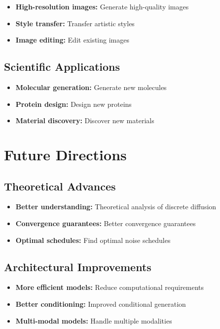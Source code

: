 \begin{itemize}
    \item \textbf{High-resolution images:} Generate high-quality images
    \item \textbf{Style transfer:} Transfer artistic styles
    \item \textbf{Image editing:} Edit existing images
\end{itemize}

\subsection{Scientific Applications}

\begin{itemize}
    \item \textbf{Molecular generation:} Generate new molecules
    \item \textbf{Protein design:} Design new proteins
    \item \textbf{Material discovery:} Discover new materials
\end{itemize}

\section{Future Directions}

\subsection{Theoretical Advances}

\begin{itemize}
    \item \textbf{Better understanding:} Theoretical analysis of discrete diffusion
    \item \textbf{Convergence guarantees:} Better convergence guarantees
    \item \textbf{Optimal schedules:} Find optimal noise schedules
\end{itemize}

\subsection{Architectural Improvements}

\begin{itemize}
    \item \textbf{More efficient models:} Reduce computational requirements
    \item \textbf{Better conditioning:} Improved conditional generation
    \item \textbf{Multi-modal models:} Handle multiple modalities
\end{itemize}

